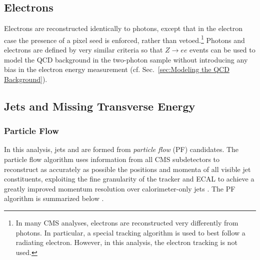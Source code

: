 \documentclass[dissertation.tex]{subfiles}
\begin{document}
\subsection{Electrons}
\label{sec:Electrons}

Electrons are reconstructed identically to photons, except that in the electron case the presence of a pixel seed is enforced, rather than vetoed.\footnote{In many CMS analyses, electrons are reconstructed very differently from photons.  In particular, a special tracking algorithm \cite{GSF_reco} is used to best follow a radiating electron.  However, in this analysis, the electron tracking is not used.}  Photons and electrons are defined by very similar criteria so that $Z\rightarrow ee$ events can be used to model the QCD background in the two-photon sample without introducing any bias in the electron energy measurement (cf. Sec.~\ref{sec:Modeling the QCD Background}).

\subsection{Jets and Missing Transverse Energy}
\label{sec:Jets and Missing Transverse Energy}

\subsubsection{Particle Flow}
\label{sec:Particle Flow}

In this analysis, jets and \MET are formed from \textit{particle flow} (PF) candidates.  The particle flow algorithm \cite{PF_algo, PF_perf} uses information from all CMS subdetectors to reconstruct as accurately as possible the positions and momenta of all visible jet constituents, exploiting the fine granularity of the tracker and ECAL to achieve a greatly improved momentum resolution over calorimeter-only jets \cite{CMS_JES_paper}.  The PF algorithm is summarized below \cite{PF_note}.
\end{document}
